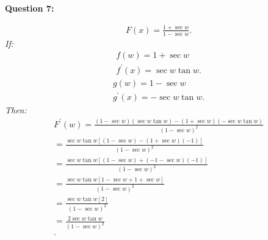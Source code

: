\documentclass{report}
\begin{document}
    \pagebreak \bigbreak \noindent
    \begin{Large}
        \textbf{Question 7:}
    \end{Large}
    \bigbreak \noindent 
    \bigbreak \noindent 
    \begin{align*}
        F(x) = \frac{1+\sec{w}}{1-\sec{w}}
    .\end{align*}
    \bigbreak \noindent 
    \textit{If:}
    \begin{align*}
        f(w) = 1+\sec{w} \\
        f^{\prime}(x) = \sec{w}\tan{w}
    .\end{align*}
    \begin{align*}
        g(w) = 1-\sec{w} \\ 
        g^{\prime}(x) = -\sec{w}\tan{w}
    .\end{align*}
    \bigbreak \noindent 
    \textit{Then:}
    \begin{align*}
        F^{\prime}(w) = \frac{(1-\sec{w})(\sec{w}\tan{w})-(1+\sec{w})(-\sec{w}\tan{w})}{(1-\sec{w})^2} \\
        = \frac{\sec{w}\tan{w}[(1-\sec{w}) - (1+\sec{w})(-1)]}{(1-\sec{w})^2} \\
        = \frac{\sec{w}\tan{w}[(1-\sec{w})+( - 1-\sec{w})(-1)]}{(1-\sec{w})^2} \\
        = \frac{\sec{w}\tan{w}[1-\sec{w}+1+\sec{w}]}{(1-\sec{w})^2} \\
        = \frac{\sec{w}\tan{w}[2]}{(1-\sec{w})^2} \\
        = \frac{2\sec{w}\tan{w}}{(1-\sec{w})^2} \\
    .\end{align*}
\end{document}
